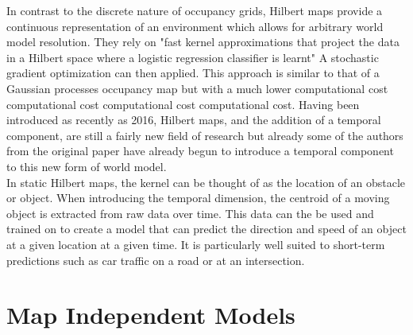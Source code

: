   In contrast to the discrete nature of occupancy grids, Hilbert maps provide a
  continuous representation of an environment which allows for arbitrary world
  model resolution. They rely on "fast kernel approximations that project the
  data in a Hilbert space where a logistic regression classifier is learnt"
  A stochastic gradient optimization can then applied. This approach is similar to
  that of a Gaussian processes occupancy map but with a much lower computational
  cost computational cost computational cost computational cost. Having been
  introduced as recently as 2016, Hilbert maps, and the addition of a temporal
  component, are still a fairly new field of research but already some of the
  authors from the original paper have already begun to introduce a temporal
  component to this new form of world model. \cite{Ramos2016, Senanayake2016} \\

  In static Hilbert maps, the kernel can be thought of as the location of an
  obstacle or object. When introducing the temporal dimension, the centroid of a
  moving object is extracted from raw data over time. This data can the be used
  and trained on to create a model that can predict the direction and speed of an
  object at a given location at a given time. It is particularly well suited to
  short-term predictions such as car traffic on a road or at an intersection.
  \cite{Senanayake2016} \cite{Senanayake2017}

  \section{ Map Independent Models }

